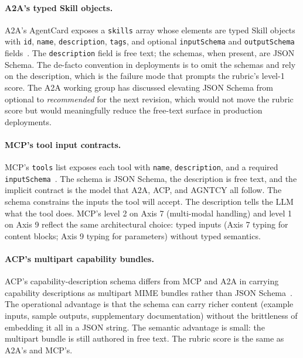 \paragraph{A2A's typed Skill objects.}
A2A's AgentCard exposes a \texttt{skills} array whose elements
are typed Skill objects with \texttt{id},
\texttt{name}, \texttt{description}, \texttt{tags}, and
optional \texttt{inputSchema} and \texttt{outputSchema}
fields~\cite{spec_a2a}. The \texttt{description} field is
free text; the schemas, when present, are JSON Schema. The
de-facto convention in deployments is to omit the schemas
and rely on the description, which is the failure mode that
prompts the rubric's level-1 score. The A2A working group has
discussed elevating JSON Schema from optional to
\emph{recommended} for the next revision, which would not
move the rubric score but would meaningfully reduce the
free-text surface in production deployments.

\paragraph{MCP's tool input contracts.}
MCP's \texttt{tools} list exposes each tool with
\texttt{name}, \texttt{description}, and a required
\texttt{inputSchema}~\cite{spec_mcp}. The schema is JSON
Schema, the description is free text, and the implicit
contract is the model that A2A, ACP, and AGNTCY all follow.
The schema constrains the inputs the tool will accept. The
description tells the LLM what the tool does.
MCP's level 2 on Axis 7 (multi-modal handling) and level 1
on Axis 9 reflect the same architectural choice: typed
inputs (Axis 7 typing for content blocks; Axis 9 typing for
parameters) without typed semantics.

\paragraph{ACP's multipart capability bundles.}
ACP's capability-description schema differs from MCP and A2A
in carrying capability descriptions as multipart MIME
bundles rather than JSON Schema~\cite{spec_acp}. The
operational advantage is that the schema can carry richer
content (example inputs, sample outputs, supplementary
documentation) without the brittleness of embedding it all
in a JSON string. The semantic advantage is small: the
multipart bundle is still authored in free text. The
rubric score is the same as A2A's and MCP's.

